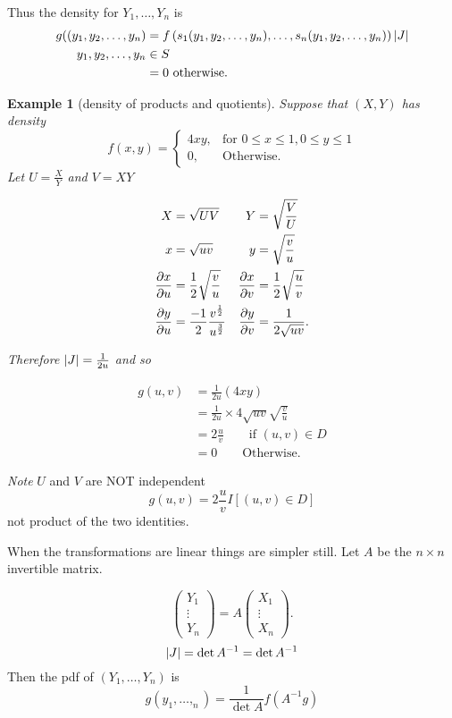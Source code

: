 \documentclass{notes}
\theoremstyle{plain}
\newtheorem*{example}{Example}
\begin{document}
Thus the density for  $Y_1,\dots,Y_n$ is
\begin{align*} 
g((y_1,y_2,\dots, y_n) &= f\left(s_1(y_1,y_2,\dots,
  y_n),\dots,s_n(y_1,y_2,\dots, y_n)\right)\left|J\right|\\
y_1,y_2,\dots, y_n &\in S\\
&= 0 \text{ otherwise.}
\end{align*}
\begin{example}[density of products and quotients]

Suppose that $(X,Y)$ has density 
\begin{equation}
f(x,y) = 
\begin{cases}
4xy, & \text{for } 0 \leq x \leq 1, 0 \leq y \leq 1\\
0, & \text{Otherwise.}
\end{cases}
\end{equation}
Let $U=\frac{X}{Y}$ and $V= XY$

\vspace{3in}

\begin{align*}
X&=\sqrt{UV} & Y&= \sqrt{\frac{V}{U}}\\
x&=\sqrt{uv} & y&= \sqrt{\frac{v}{u}}\\
\frac{\partial x}{\partial u}&= \frac{1}{2}\sqrt{\frac{v}{u}} & \frac{\partial x}{\partial v} &=
 \frac{1}{2}\sqrt{\frac{u}{v}}\\
\frac{\partial y}{\partial u}& = \frac{-1}{2}\frac{v^\frac{1}{2}}{u^\frac{3}{2}} &
\frac{\partial y}{\partial v} &= \frac{1}{2\sqrt{uv}}.
\end{align*}

Therefore $\left|J\right| = \frac{1}{2u}$ and so

\begin{align*}
g(u,v) &= \frac{1}{2u}(4xy)\\
&= \frac{1}{2u} \times 4\sqrt{uv}\sqrt{\frac{v}{u}}\\
&=2\frac{u}{v} \qquad \text{if } (u,v) \in D\\
&= 0 \qquad \text{Otherwise}.
\end{align*}
\end{example}

\emph{Note} $U$ and $V$ are NOT independent
\[
g(u,v) = 2 \frac{u}{v}I[(u,v) \in D]
\]
not product of the two identities.

When the transformations are linear things are simpler still.  Let $A$
be the $n\times n$ invertible matrix.

\[
\begin{pmatrix}
Y_1 \\ \vdots \\ Y_n
\end{pmatrix}
= A \begin{pmatrix}
X_1 \\ \vdots \\ X_n
\end{pmatrix}.
\]
\[
\left|J\right| = \det{A^{-1}} = \det{A}^{-1}
\]
Then the pdf of $(Y_1,\dots,Y_n)$ is 
\[
g(y_1,\dots,_n) = \frac{1}{\det{A}}f(A^{-1}g)
\]
\end{document}

